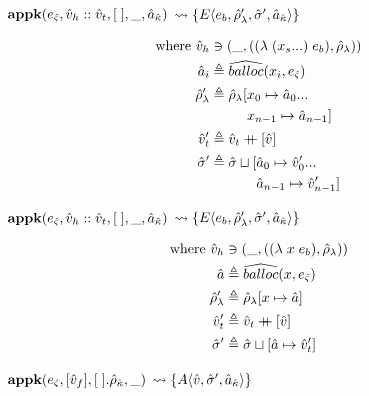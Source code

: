 \documentclass[12pt,draft]{article}
\newcommand\mdoubleplus{\ensuremath{\mathbin{+\mkern-9mu+}}}
\newcommand{\lamsyn}[2]{(\lambda\;(#1 ...)\;#2)}
\newcommand{\vararglamsyn}[2]{(\lambda\;#1\;#2)}
\newcommand{\E}[4]{E\langle #1 , #2 , #3 , #4 \rangle}
\newcommand{\A}[3]{A\langle #1 , #2 , #3 \rangle}
\begin{document}
\begin{multicols*}{2}
\vfill\null
\columnbreak


\begin{center}
  $\textbf{appk}(e_{\hat{\varsigma}}, \hat{v}_h::\hat{v}_t , [\;] , \_ , \hat{a}_{\hat{\kappa}})$
  $\leadsto \{\E{e_b}{\aenv_{\lambda}'}{\astore'}{\akaddr}\}$
\end{center}
\vspace{-7mm}
\begin{align*}
  \text{where }
  \aval_h &\ni (\_ , (\lamsyn{x_s}{e_b} , \aenv_{\lambda})) \\
  \abaddr_i &\triangleq \aballoc{x_i , \ectrl}\\
  \aenv_{\lambda}' &\triangleq \aenv_{\lambda}[x_0 \mapsto \abaddr_0 ... \\
          &\;\;\;\;\;\;\;\;\;\,x_{n-1} \mapsto \abaddr_{n-1}] \\
  \aval_t' &\triangleq \aval_t \mdoubleplus [\aval] \\
  \astore' &\triangleq \astore \sqcup [\abaddr_0 \mapsto \aval_0' ... \\
          &\;\;\;\;\;\;\;\;\;\;\;\;\abaddr_{n-1} \mapsto \aval_{n-1}']
\end{align*}
\begin{center}
  $\textbf{appk}(e_{\hat{\varsigma}}, \hat{v}_h::\hat{v}_t , [\;] , \_ , \hat{a}_{\hat{\kappa}})$
  $\leadsto \{\E{e_b}{\aenv_{\lambda}'}{\astore'}{\akaddr}\}$
\end{center}
\vspace{-7mm}
\begin{align*}
  \text{where }
  \aval_h &\ni (\_ , (\vararglamsyn{x}{e_b} , \aenv_{\lambda})) \\
  \abaddr &\triangleq \aballoc{x , \ectrl} \\
  \aenv_{\lambda}' &\triangleq \aenv_{\lambda}[x \mapsto \abaddr] \\
  \aval_t' &\triangleq \aval_t \mdoubleplus [\aval] \\
  \astore' &\triangleq \astore \sqcup [\abaddr \mapsto \aval_t']
\end{align*}
\begin{center}
  $\textbf{appk}(e_{\hat{\varsigma}} , [\hat{v}_f] , [\;] . \hat{\rho}_{\hat{\kappa}} , \_)$
  $\leadsto \{\A{\aval}{\astore'}{\akaddr}\}$
\end{center}

\end{multicols*}
\end{document}
